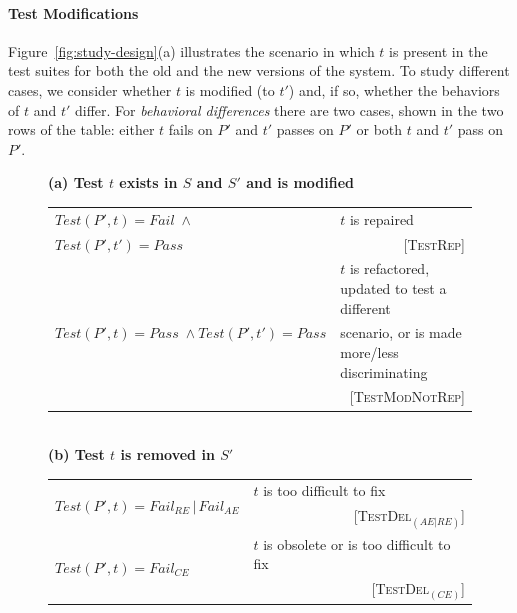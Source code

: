 \documentclass[conference]{IEEEtran}
\newcommand{\mt}{\mathit}
\newcommand{\pass}{\mt{Pass}}
\newcommand{\fail}{\mt{Fail}}
\newcommand{\failce}{\mt{Fail}_{CE}}
\newcommand{\failre}{\mt{Fail}_{RE}}
\newcommand{\failae}{\mt{Fail}_{AE}}
\newcommand{\testfunc}[2]{\mt{Test(#1, #2)}}
\newcommand{\catrep}{\textsc{TestRep}}
\newcommand{\catref}{\textsc{TestModNotRep}}
\newcommand{\catdelaere}{\textsc{TestDel}$_\mt{(AE|RE)}$}
\newcommand{\catdelce}{\textsc{TestDel}$_\mt{(CE)}$}
\begin{document}
\paragraph*{\textbf{Test Modifications}}
\label{sec:test-mod}

Figure~\ref{fig:study-design}(a) illustrates the scenario in which $t$
is present in the test suites for both the old and the new versions of
the system. To study different cases, we consider whether $t$ is
modified (to $t'$) and, if so, whether the behaviors of $t$ and $t'$
differ. For \textit{behavioral differences} there are two cases, shown
in the two rows of the table: either $t$ fails on $P'$ and $t'$ passes
on $P'$ or both $t$ and $t'$ pass on $P'$.

\begin{figure}[t]
\centering
\footnotesize
\tabcolsep=3pt
\textbf{(a) Test $t$ exists in $S$ and $S'$ and is modified}
\\ [2pt]
\begin{tabular}{|l||l|}
\hline
$\testfunc{P'}{t} = \fail \; \wedge$ &
$t$ is repaired \\
$\testfunc{P'}{t'} = \pass$ &
\multicolumn{1}{r|}{\scriptsize [\catrep{}]}\\
\hline
\multirow{3}{28mm}{$\testfunc{P'}{t} = \pass \; \wedge \testfunc{P'}{t'} = \pass$} &
$t$ is refactored, updated to test a different \\
& scenario, or is made more/less discriminating \\
& \multicolumn{1}{r|}{\scriptsize [\catref{}]} \\
\hline
\end{tabular}
\\ [8pt]
%
\textbf{(b) Test $t$ is removed in $S'$}
\\ [2pt]
\begin{tabular}{|l||l|}
\hline
\multirow{2}{*}{$\testfunc{P'}{t} = \failre \, | \, \failae$} &
$t$ is too difficult to fix \\
& \multicolumn{1}{r|}{\scriptsize [\catdelaere{}]} \\
\hline
\multirow{2}{*}{$\testfunc{P'}{t} = \failce$} & $t$ is obsolete or is
too difficult to fix \\
& \multicolumn{1}{r|}{\scriptsize [\catdelce{}]} \\

\end{tabular}
\end{figure}
\end{document}
